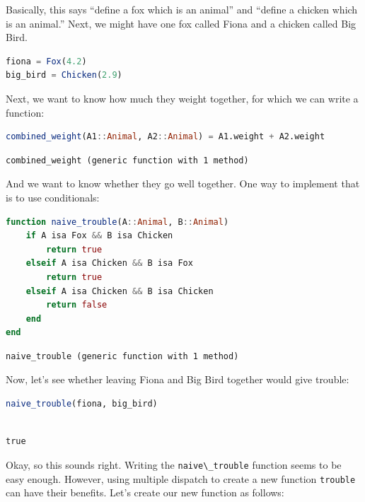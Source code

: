\documentclass[
  notoc %
]{tufte-book}
\newcommand{\passthrough}[1]{#1}
\begin{document}
Basically, this says ``define a fox which is an animal'' and ``define a
chicken which is an animal.'' Next, we might have one fox called Fiona
and a chicken called Big Bird.

\begin{lstlisting}[language=Julia]
fiona = Fox(4.2)
big_bird = Chicken(2.9)
\end{lstlisting}

Next, we want to know how much they weight together, for which we can
write a function:

\begin{lstlisting}[language=Julia]
combined_weight(A1::Animal, A2::Animal) = A1.weight + A2.weight
\end{lstlisting}

\begin{lstlisting}[language=Output]
combined_weight (generic function with 1 method)
\end{lstlisting}

And we want to know whether they go well together. One way to implement
that is to use conditionals:

\begin{lstlisting}[language=Julia]
function naive_trouble(A::Animal, B::Animal)
    if A isa Fox && B isa Chicken
        return true
    elseif A isa Chicken && B isa Fox
        return true
    elseif A isa Chicken && B isa Chicken
        return false
    end
end
\end{lstlisting}

\begin{lstlisting}[language=Output]
naive_trouble (generic function with 1 method)
\end{lstlisting}

Now, let's see whether leaving Fiona and Big Bird together would give
trouble:

\begin{lstlisting}[language=Julia]
naive_trouble(fiona, big_bird)
\end{lstlisting}

\begin{lstlisting}[language=Output]

true

\end{lstlisting}

Okay, so this sounds right. Writing the
\passthrough{\lstinline!naive\_trouble!} function seems to be easy
enough. However, using multiple dispatch to create a new function
\passthrough{\lstinline!trouble!} can have their benefits. Let's create
our new function as follows:
\end{document}
